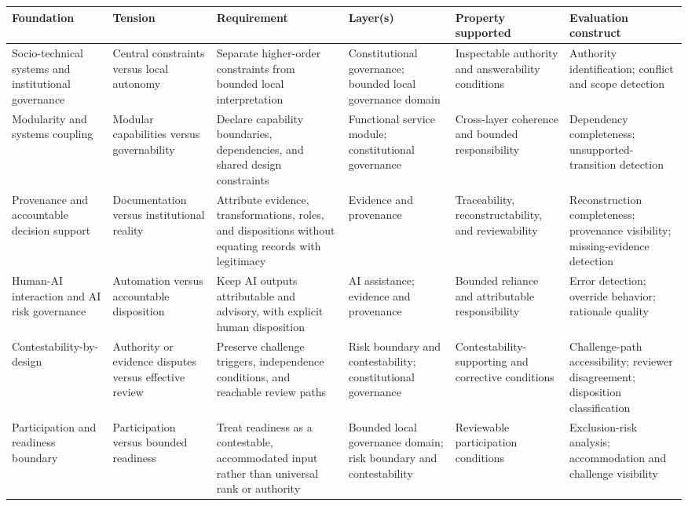 \documentclass[11pt]{article}
\begin{document}
\begin{landscape}
\begin{center}
\scriptsize
\begin{tabularx}{\linewidth}{|X|X|X|X|X|X|}
\hline
\textbf{Foundation} & \textbf{Tension} & \textbf{Requirement} &
\textbf{Layer(s)} & \textbf{Property supported} &
\textbf{Evaluation construct} \\
\hline
Socio-technical systems and institutional governance & Central constraints
versus local autonomy & Separate higher-order constraints from bounded local
interpretation & Constitutional governance; bounded local governance domain &
Inspectable authority and answerability conditions & Authority identification;
conflict and scope detection \\
\hline
Modularity and systems coupling & Modular capabilities versus governability &
Declare capability boundaries, dependencies, and shared design constraints &
Functional service module; constitutional governance & Cross-layer coherence
and bounded responsibility & Dependency completeness; unsupported-transition
detection \\
\hline
Provenance and accountable decision support & Documentation versus
institutional reality & Attribute evidence, transformations, roles, and
dispositions without equating records with legitimacy & Evidence and
provenance & Traceability, reconstructability, and reviewability &
Reconstruction completeness; provenance visibility; missing-evidence detection \\
\hline
Human-AI interaction and AI risk governance & Automation versus accountable
disposition & Keep AI outputs attributable and advisory, with explicit human
disposition & AI assistance; evidence and provenance & Bounded reliance and
attributable responsibility & Error detection; override behavior; rationale
quality \\
\hline
Contestability-by-design & Authority or evidence disputes versus effective
review & Preserve challenge triggers, independence conditions, and reachable
review paths & Risk boundary and contestability; constitutional governance &
Contestability-supporting and corrective conditions & Challenge-path
accessibility; reviewer disagreement; disposition classification \\
\hline
Participation and readiness boundary & Participation versus bounded readiness &
Treat readiness as a contestable, accommodated input rather than universal rank
or authority & Bounded local governance domain; risk boundary and
contestability & Reviewable participation conditions & Exclusion-risk analysis;
accommodation and challenge visibility \\
\hline
\end{tabularx}
\end{center}
\end{landscape}
\end{document}
